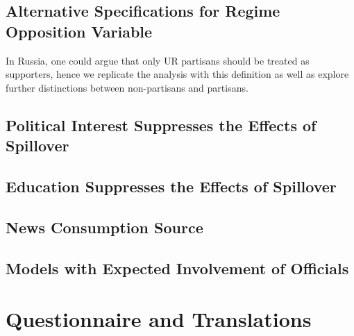 \documentclass[11pt, ngerman,english,a4]{article}
\begin{document}
\clearpage


\clearpage




\subsection*{Alternative Specifications for Regime Opposition Variable}

In Russia, one could argue that only UR partisans should be treated as supporters, hence we replicate the analysis with this definition as well as explore further distinctions between non-partisans and partisans. 


\subsection*{Political Interest Suppresses the Effects of Spillover}
\subsection*{Education Suppresses the Effects of Spillover}

\subsection*{News Consumption Source}


\subsection*{Models with Expected Involvement of Officials}


\section*{Questionnaire and Translations}






\end{document}

